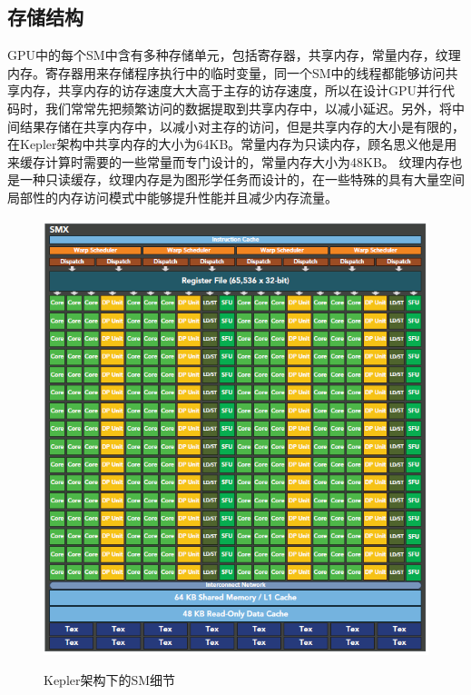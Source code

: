 \subsection{存储结构}
GPU中的每个SM中含有多种存储单元，包括寄存器，共享内存，常量内存，纹理内存。寄存器用来存储程序执行中的临时变量，同一个SM中的线程都能够访问共享内存，共享内存的访存速度大大高于主存的访存速度，所以在设计GPU并行代码时，我们常常先把频繁访问的数据提取到共享内存中，以减小延迟。另外，将中间结果存储在共享内存中，以减小对主存的访问，但是共享内存的大小是有限的，在Kepler架构中共享内存的大小为64KB。常量内存为只读内存，顾名思义他是用来缓存计算时需要的一些常量而专门设计的，常量内存大小为48KB。 纹理内存也是一种只读缓存，纹理内存是为图形学任务而设计的，在一些特殊的具有大量空间局部性的内存访问模式中能够提升性能并且减少内存流量。
\begin{figure}
\setlength{\abovecaptionskip}{-0.5cm}
\begin{center}
{\includegraphics[width=0.8 \textwidth]{figures/smx.png}}
\end{center}
\caption{{\footnotesize{Kepler架构下的SM细节}}}
\label{sm}
\end{figure}
